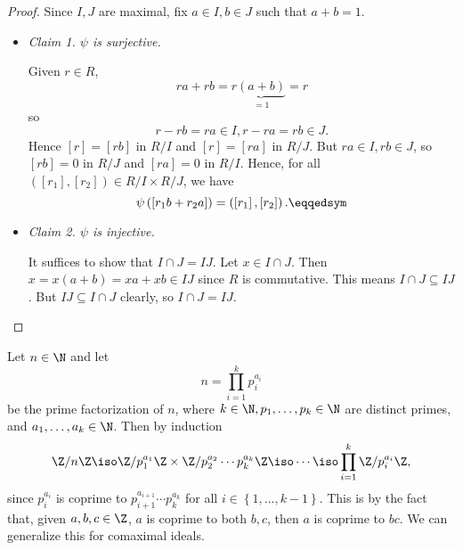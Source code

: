 \documentclass[pmath347]{subfiles}
\begin{document}
    \begin{proof}
        Since $I,J$ are maximal, fix $a\in I, b\in J$ such that $a+b=1$.
        \begin{itemize}
            \item \textit{Claim 1. $\psi$ is surjective.}

                \begin{subproof}
                    Given $r\in R$,
                    \begin{equation*}
                        ra + rb = r\underbrace{\left( a+b \right)}_{=1} = r
                    \end{equation*}
                    so
                    \begin{equation*}
                        r - rb = ra\in I, r-ra = rb\in J.
                    \end{equation*}
                    Hence $\left[ r \right] = \left[ rb \right]$ in $R /I$ and $\left[ r \right] = \left[ ra \right] $ in $R /J$. But $ra\in I, rb\in J$, so $\left[ rb \right] = 0$ in $R /J$ and $\left[ ra \right] = 0$ in $R /I$. Hence, for all $\left( \left[ r_1 \right] , \left[ r_2 \right]  \right) \in R /I\times R /J$, we have
                    \begin{equation*}
                        \psi\left( \left[ r_1b+r_2a \right]  \right) = \left( \left[ r_1 \right] , \left[ r_2 \right]  \right) .\eqqedsym
                    \end{equation*}
                \end{subproof}

            \item \textit{Claim 2. $\psi$ is injective.}

                \begin{subproof}
                    It suffices to show that $I\cap J = IJ$. Let $x\in I\cap J$. Then $x = x\left( a+b \right) = xa+xb \in IJ$ since $R$ is commutative. This means $I\cap J\subseteq IJ$. But $IJ\subseteq I\cap J$ clearly, so $I\cap J = IJ$. \qqedsym
                \end{subproof}
        \end{itemize} 
    \end{proof}

    Let $n\in\N$ and let
    \begin{equation*}
        n = \prod^{k}_{i=1} p_i^{a_i}
    \end{equation*}
    be the prime factorization of $n$, where $k\in\N, p_1,\ldots,p_k\in\N$ are distinct primes, and $a_1,\ldots,a_k\in\N$. Then by induction
    \begin{equation*}
        \Z /n\Z \iso \Z /p_1^{a_1}\Z\times \Z /p_2^{a_2}\cdots p_k^{a_k}\Z \iso\cdots\iso \prod^{k}_{i=1} \Z /p_i^{a_i}\Z,
    \end{equation*}
    since $p_i^{a_i}$ is coprime to $p_{i+1}^{a_{i+1}}\cdots p_k^{a_k}$ for all $i\in\left\lbrace 1,\ldots,k-1 \right\rbrace$. This is by the fact that, given $a,b,c\in\Z$, $a$ is coprime to both $b,c$, then $a$ is coprime to $bc$. We can generalize this for comaximal ideals.
\end{document}
